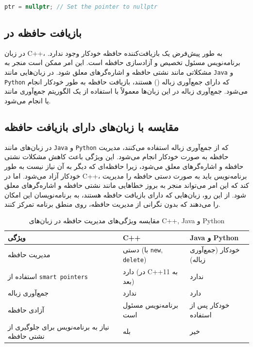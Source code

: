 \documentclass[12pt, a4paper]{report}
\begin{document}
\LTR
\begin{lstlisting}[language=C++, breaklines=true]
	ptr = nullptr; // Set the pointer to nullptr
\end{lstlisting}
\RTL

\subsection{بازیافت حافظه در }
در زبان C++، به طور پیش‌فرض یک بازیافت‌کننده حافظه خودکار وجود ندارد. برنامه‌نویس مسئول تخصیص و آزادسازی حافظه است. این امر ممکن است منجر به مشکلاتی مانند نشتی حافظه و اشاره‌گرهای معلق شود. در زبان‌هایی مانند \texttt{Java} و \texttt{Python} که دارای جمع‌آوری زباله () هستند، بازیافت حافظه به طور خودکار انجام می‌شود. جمع‌آوری زباله در این زبان‌ها معمولاً با استفاده از یک الگوریتم جمع‌آوری مانند \texttt{} یا \texttt{} انجام می‌شود.

\subsection{مقایسه  با زبان‌های دارای بازیافت حافظه}
در زبان‌های مانند \texttt{Java} و \texttt{Python} که از جمع‌آوری زباله استفاده می‌کنند، مدیریت حافظه به صورت خودکار انجام می‌شود. این ویژگی باعث کاهش مشکلات نشتی حافظه و اشاره‌گرهای معلق می‌شود، زیرا حافظه‌ای که دیگر به آن نیاز نیست به طور خودکار آزاد می‌شود. اما در C++، برنامه‌نویس باید به صورت دستی حافظه را مدیریت کند که این امر می‌تواند منجر به بروز خطاهایی مانند نشتی حافظه و اشاره‌گرهای معلق شود. از این رو، زبان‌هایی که دارای بازیافت حافظه هستند، به برنامه‌نویسان این امکان را می‌دهند که بدون نگرانی از مدیریت حافظه، روی منطق برنامه تمرکز کنند.

\begin{table}[H]
	\centering
	\begin{tabular}{|p{4cm}|p{3cm}|p{7cm}|}
		\hline
		\textbf{ویژگی} & \textbf{C++} & \textbf{Java} و \textbf{Python} \\
		\hline
		مدیریت حافظه &
		دستی (با \texttt{new}, \texttt{delete}) &
		خودکار (جمع‌آوری زباله) \\
		\hline
		استفاده از \texttt{smart pointers} &
		دارد (در C++11 به بعد) &
		ندارد \\
		\hline
		جمع‌آوری زباله &
		ندارد &
		دارد \\
		\hline
		آزادی حافظه &
		برنامه‌نویس مسئول است &
		خودکار پس از استفاده \\
		\hline
		نیاز به برنامه‌نویس برای جلوگیری از نشتی حافظه &
		بله &
		خیر \\
		\hline
	\end{tabular}
	\caption{مقایسه ویژگی‌های مدیریت حافظه در زبان‌های C++, Java و Python}
	\label{tab:memory_management}
\end{table}
\end{document}
